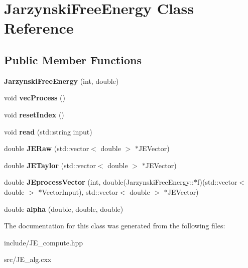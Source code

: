 \hypertarget{classJarzynskiFreeEnergy}{}\section{Jarzynski\+Free\+Energy Class Reference}
\label{classJarzynskiFreeEnergy}
\subsection*{Public Member Functions}
\begin{DoxyCompactItemize}
\item 
\mbox{\label{classJarzynskiFreeEnergy_a6d7cc9d290833e8e494695add4691f79}} 
{\bfseries Jarzynski\+Free\+Energy} (int, double)
\item 
\mbox{\label{classJarzynskiFreeEnergy_a7765d4e262c6705461d9eb9e1ac0f502}} 
void {\bfseries vec\+Process} ()
\item 
\mbox{\label{classJarzynskiFreeEnergy_a0488e0cac955936c16405ff5ec8de5c1}} 
void {\bfseries reset\+Index} ()
\item 
\mbox{\label{classJarzynskiFreeEnergy_a4d6391b365eee3e95932b9166320dc70}} 
void {\bfseries read} (std\+::string input)
\item 
\mbox{\label{classJarzynskiFreeEnergy_afadb2d232cfc8d15eb03aff7a5f0a56d}} 
double {\bfseries J\+E\+Raw} (std\+::vector$<$ double $>$ $\ast$J\+E\+Vector)
\item 
\mbox{\label{classJarzynskiFreeEnergy_ab6cbfd29bad121a95411758c00f07b8f}} 
double {\bfseries J\+E\+Taylor} (std\+::vector$<$ double $>$ $\ast$J\+E\+Vector)
\item 
\mbox{\label{classJarzynskiFreeEnergy_a08c0fc232cb17af249320c14a6c6d75e}} 
double {\bfseries J\+Eprocess\+Vector} (int, double(Jarzynski\+Free\+Energy\+::$\ast$f)(std\+::vector$<$ double $>$ $\ast$Vector\+Input), std\+::vector$<$ double $>$ $\ast$J\+E\+Vector)
\item 
\mbox{\label{classJarzynskiFreeEnergy_a6f37399a471ad364a4eba666915dbfca}} 
double {\bfseries alpha} (double, double, double)
\end{DoxyCompactItemize}


The documentation for this class was generated from the following files\+:\begin{DoxyCompactItemize}
\item 
include/J\+E\+\_\+compute.\+hpp\item 
src/J\+E\+\_\+alg.\+cxx\end{DoxyCompactItemize}
